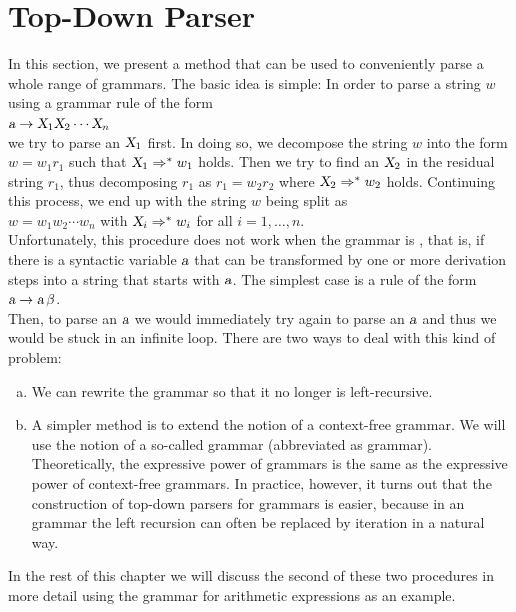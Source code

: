 \section{Top-Down Parser}
In this section, we present a method that can be used to conveniently parse a whole range of
grammars.  The basic idea is simple: In order to parse a string $w$ using
a grammar rule of the form
\\[0.2cm]
\hspace*{1.3cm}
$\textsl{a} \rightarrow \textsl{X}_1 \textsl{X}_2 \cdots \textsl{X}_n$
\\[0.2cm]
we try to parse an $\textsl{X}_1$ first.  In doing so, we decompose the string $w$ into the
form
$w = w_1 r_1$ such that $\textsl{X}_1 \Rightarrow^* w_1$ holds.  Then we try to find an $\textsl{X}_2$ in the residual string
$r_1$, thus decomposing $r_1$ as $r_1 = w_2 r_2$ where
$\textsl{X}_2 \Rightarrow^* w_2$ holds.  Continuing this process, we end up with the string $w$ being split as
\\[0.2cm]
\hspace*{1.3cm}
$w = w_1 w_2 \cdots w_n$ \quad with $\textsl{X}_i \Rightarrow^* w_i$ for all $i=1,\ldots,n$.
\\[0.2cm]
Unfortunately, this procedure does not work when the grammar is
, that is, if there is a syntactic variable $\textsl{a}$ that
can be transformed by one or more derivation steps into a string that starts with $\textsl{a}$.  The simplest
case is a rule of the form
\\[0.2cm]
\hspace*{1.3cm}
$\textsl{a} \rightarrow \textsl{a}\, \beta$.
\\[0.2cm]
Then, to parse an $\textsl{a}$ we would immediately try again to parse an $\textsl{a}$ and thus we would be stuck in an infinite loop.
There are two ways to deal with this kind of problem:
\begin{enumerate}[(a)]
\item We can rewrite the grammar so that it no longer is left-recursive.
\item A simpler method is to extend the notion of a context-free grammar.
      We will use the notion of a so-called  grammar
      (abbreviated as  grammar).   Theoretically, the expressive power of
       grammars is the same as the expressive power of context-free grammars.
      In practice, however, it turns out that the construction of top-down parsers for
       grammars is easier, because in an  grammar the left recursion can often be replaced
      by iteration in a natural way. 
\end{enumerate}
In the rest of this chapter we will discuss the second of these two procedures in more detail using the grammar for
arithmetic expressions as an example.  


